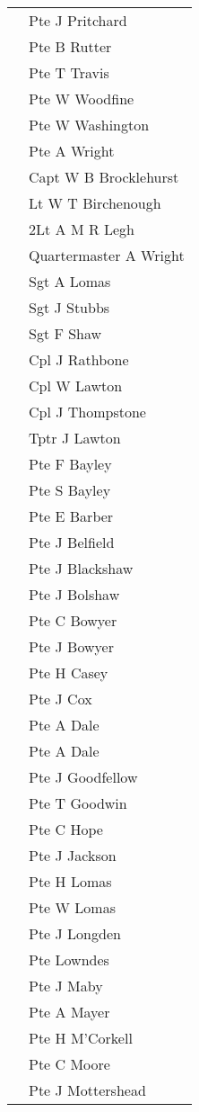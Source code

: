 \begin{center}
\begin{tabular}{rl}
    & Pte J Pritchard \\
    & Pte B Rutter \\
    & Pte T Travis \\
    & Pte W Woodfine \\
    & Pte W Washington \\
    & Pte A Wright \\
    & Capt W B Brocklehurst \\
    & Lt W T Birchenough \\
    & 2Lt A M R Legh \\
    & Quartermaster A Wright \\
    & Sgt A Lomas \\
    & Sgt J Stubbs \\
    & Sgt F Shaw \\
    & Cpl J Rathbone \\
    & Cpl W Lawton \\
    & Cpl J Thompstone \\
    & Tptr J Lawton \\
    & Pte F Bayley \\
    & Pte S Bayley \\
    & Pte E Barber \\
    & Pte J Belfield \\
    & Pte J Blackshaw \\
    & Pte J Bolshaw \\
    & Pte C Bowyer \\
    & Pte J Bowyer \\
    & Pte H Casey \\
    & Pte J Cox \\
    & Pte A Dale \\
    & Pte A Dale \\
    & Pte J Goodfellow \\
    & Pte T Goodwin \\
    & Pte C Hope \\
    & Pte J Jackson \\
    & Pte H Lomas \\
    & Pte W Lomas \\
    & Pte J Longden \\
    & Pte Lowndes \\
    & Pte J Maby \\
    & Pte A Mayer \\
    & Pte H M'Corkell \\
    & Pte C Moore \\
    & Pte J Mottershead \\

\end{tabular}
\end{center}
